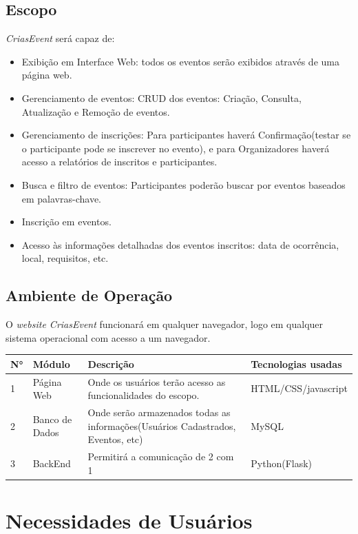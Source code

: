 \section{Escopo}
    \textit{CriasEvent} será capaz de:
    \begin{itemize}
      \item Exibição em Interface Web: todos os eventos serão exibidos através de uma página web. 
      \item Gerenciamento de eventos: CRUD dos eventos: Criação, Consulta, Atualização e Remoção de eventos.
      \item Gerenciamento de inscrições: Para participantes haverá Conﬁrmação(testar se o participante pode se inscrever no evento), e para Organizadores haverá acesso a relatórios de inscritos e participantes.
      \item Busca e ﬁltro de eventos: Participantes poderão buscar por eventos baseados em palavras-chave.
      \item Inscrição em eventos.
      \item Acesso às informações detalhadas dos eventos inscritos: data de ocorrência, local, requisitos, etc.
    \end{itemize}

\section{Ambiente de Operação}
	O \textit{website CriasEvent} funcionará em qualquer navegador, logo  em qualquer sistema operacional com acesso a um navegador.

\begin{tabular}{>{\raggedright}p{1.5cm}>{\raggedright}p{4cm}>{\raggedright}p{6cm}>{\raggedright}p{4cm}}
\toprule
  \textbf{N°} & \textbf{Módulo} & \textbf{Descrição} & \textbf{Tecnologias usadas} \tabularnewline 
\midrule
  1 & Página Web & Onde os usuários terão acesso as funcionalidades do escopo. & HTML/CSS/javascript\tabularnewline \hline
  2 & Banco de Dados & Onde serão armazenados todas as informações(Usuários Cadastrados, Eventos, etc) & MySQL\tabularnewline \hline
  3 & BackEnd & Permitirá a comunicação de 2 com 1 & Python(Flask)\tabularnewline
\bottomrule
\end{tabular}

\newpage

\chapter{Necessidades de Usuários}
